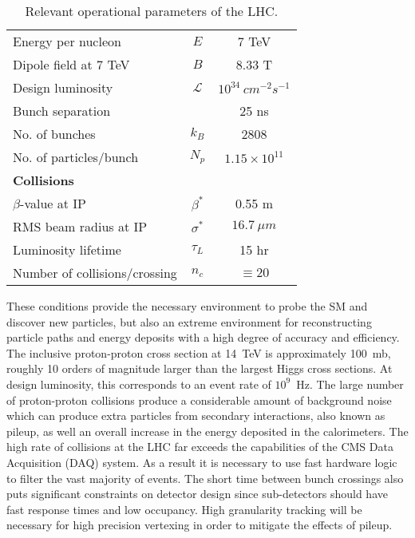 \begin{table}
\begin{center}
\begin{tabular}{l|c|c}
\hline 
\hline
Energy per nucleon           & $E$           & 7 TeV    \\
Dipole field at 7 TeV        & $B$           & 8.33 T   \\
Design luminosity            & $\mathscr{L}$ & $10^{34}~cm^{-2}s^{-1}$\\
Bunch separation             &               & 25 ns    \\
No. of bunches               & $k_B$         & 2808      \\
No. of particles/bunch       & $N_p$         & $1.15\times 10^{11}$\\ \hline
\multicolumn{3}{l}{{\bf Collisions}} \\ \hline
$\beta$-value at IP          & $\beta^*$     & 0.55 m   \\
RMS beam radius at IP        & $\sigma^*$    & $16.7~\mu m$  \\
Luminosity lifetime          & $\tau_L$      & 15 hr         \\
Number of collisions/crossing& $n_c$         & $\equiv20$      \\
\hline 
\hline
\end{tabular}
\caption{Relevant operational parameters of the LHC.}
\label{table:LHCparameters}
\end{center}
\end{table}

These conditions provide the necessary environment to probe
the SM and discover new particles, but also an extreme environment
for reconstructing particle paths and energy deposits with a high
degree of accuracy and efficiency. The inclusive proton-proton
cross section at 14~TeV is approximately 100~mb, roughly 10 orders
of magnitude larger than the largest Higgs cross sections.  
At design luminosity, this corresponds to an event rate of
$10^9$~Hz.  
The large number of proton-proton collisions produce a considerable
amount of background noise which can produce extra
particles from secondary interactions, also known as pileup, as
well an overall increase in the energy deposited in the 
calorimeters.  The  high rate of collisions at the LHC far exceeds the
capabilities of the CMS Data Acquisition (DAQ) system.  As a 
result it is necessary to use fast hardware logic to filter
the vast majority of events. 
The short time between bunch crossings also puts significant
constraints on detector design since sub-detectors should have fast
response times and low occupancy. High granularity tracking will
be necessary for high precision vertexing in order to mitigate the
effects of pileup.

